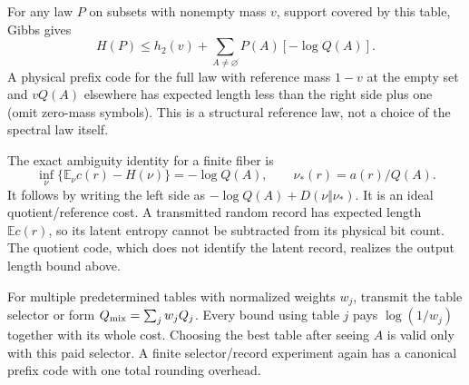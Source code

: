 \documentclass{article}
\begin{document}
For any law $P$ on subsets with nonempty mass $v$, support covered by this table, Gibbs gives
\[
 H(P)\le h_2(v)+\sum_{A\ne\varnothing}P(A)[-\log Q(A)].
\]
A physical prefix code for the full law with reference mass $1-v$ at the empty set and $vQ(A)$ elsewhere has expected length less than the right side plus one (omit zero-mass symbols). This is a structural reference law, not a choice of the spectral law itself.

The exact ambiguity identity for a finite fiber is
\[
 \inf_\nu\{\mathbb E_\nu c(r)-H(\nu)\}=-\log Q(A),
 \qquad \nu_*(r)=a(r)/Q(A).
\]
It follows by writing the left side as $-\log Q(A)+D(\nu\Vert\nu_*)$. It is an ideal quotient/reference cost. A transmitted random record has expected length $\mathbb E c(r)$, so its latent entropy cannot be subtracted from its physical bit count. The quotient code, which does not identify the latent record, realizes the output length bound above.

For multiple predetermined tables with normalized weights $w_j$, transmit the table selector or form $Q_{\rm mix}=\sum_jw_jQ_j$. Every bound using table $j$ pays $\log(1/w_j)$ together with its whole cost. Choosing the best table after seeing $A$ is valid only with this paid selector. A finite selector/record experiment again has a canonical prefix code with one total rounding overhead.
\end{document}
